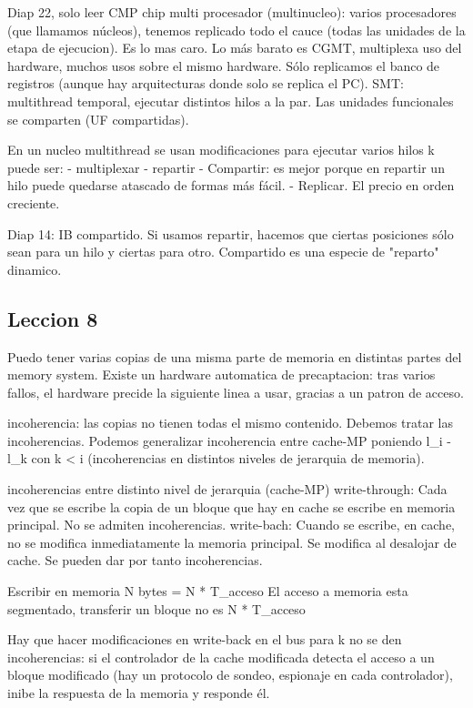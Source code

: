 Diap 22, solo leer
CMP chip multi procesador (multinucleo): varios procesadores (que llamamos núcleos), tenemos replicado todo el cauce (todas las unidades de la etapa de ejecucion). Es lo mas caro.
Lo más barato es CGMT, multiplexa uso del hardware, muchos usos sobre el mismo hardware. Sólo replicamos el banco de registros (aunque hay arquitecturas donde solo se replica el PC).
SMT: multithread temporal, ejecutar distintos hilos a la par. Las unidades funcionales se comparten (UF compartidas). 

En un nucleo multithread se usan modificaciones para ejecutar varios hilos k puede ser:
- multiplexar
- repartir
- Compartir: es mejor porque en repartir un hilo puede quedarse atascado de formas más fácil.
- Replicar.
El precio en orden creciente.

Diap 14: IB compartido. Si usamos repartir, hacemos que ciertas posiciones sólo sean para un hilo y ciertas para otro. Compartido es una especie de "reparto" dinamico.

\subsection{Leccion 8}
Puedo tener varias copias de una misma parte de memoria en distintas partes del memory system.
Existe un hardware automatica de precaptacion: tras varios fallos, el hardware precide la siguiente linea a usar, gracias a un patron de acceso.

incoherencia: las copias no tienen todas el mismo contenido. Debemos tratar las incoherencias.
 Podemos generalizar incoherencia entre cache-MP poniendo l_i - l_k con k < i (incoherencias en distintos niveles de jerarquia de memoria).

incoherencias entre distinto nivel de jerarquia (cache-MP)
write-through: Cada vez que se escribe la copia de un bloque que hay en cache se escribe en memoria principal. No se admiten incoherencias.
write-bach: Cuando se escribe, en cache, no se modifica inmediatamente la memoria principal. Se modifica al desalojar de cache. Se pueden dar por tanto incoherencias.

Escribir en memoria N bytes = N * T_acceso
El acceso a memoria esta segmentado, transferir un bloque no es N * T_acceso

Hay que hacer modificaciones en write-back en el bus para k no se den incoherencias: si el controlador de la cache modificada detecta el acceso a un bloque modificado (hay un protocolo de sondeo, espionaje en cada controlador), inibe la respuesta de la memoria y responde él.

